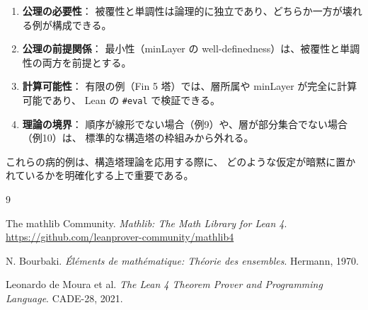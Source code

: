 \documentclass[a4paper,11pt]{ltjsarticle}
\theoremstyle{definition}
\theoremstyle{plain}
\theoremstyle{remark}
\begin{document}
\begin{enumerate}
    \item \textbf{公理の必要性}：
    被覆性と単調性は論理的に独立であり、どちらか一方が壊れる例が構成できる。

    \item \textbf{公理の前提関係}：
    最小性（minLayer の well-definedness）は、被覆性と単調性の両方を前提とする。

    \item \textbf{計算可能性}：
    有限の例（Fin 5 塔）では、層所属や minLayer が完全に計算可能であり、
    Lean の \texttt{\#eval} で検証できる。

    \item \textbf{理論の境界}：
    順序が線形でない場合（例9）や、層が部分集合でない場合（例10）は、
    標準的な構造塔の枠組みから外れる。
\end{enumerate}

これらの病的例は、構造塔理論を応用する際に、
どのような仮定が暗黙に置かれているかを明確化する上で重要である。


\begin{thebibliography}{9}

The mathlib Community.
\textit{Mathlib: The Math Library for Lean 4}.
\url{https://github.com/leanprover-community/mathlib4}

N. Bourbaki.
\textit{Éléments de mathématique: Théorie des ensembles}.
Hermann, 1970.

Leonardo de Moura et al.
\textit{The Lean 4 Theorem Prover and Programming Language}.
CADE-28, 2021.

\end{thebibliography}
\end{document}
